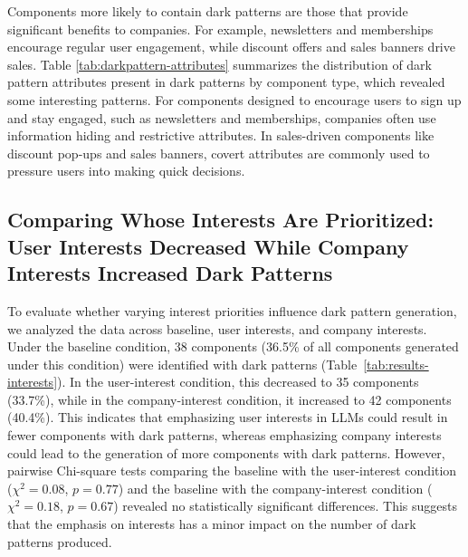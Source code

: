 

Components more likely to contain dark patterns are those that provide significant benefits to companies. For example, newsletters and memberships encourage regular user engagement, while discount offers and sales banners drive sales. Table \ref{tab:darkpattern-attributes} summarizes the distribution of dark pattern attributes present in dark patterns by component type, which revealed some interesting patterns. For components designed to encourage users to sign up and stay engaged, such as newsletters and memberships, companies often use information hiding and restrictive attributes. In sales-driven components like discount pop-ups and sales banners, covert attributes are commonly used to pressure users into making quick decisions. 

\subsection{Comparing Whose Interests Are Prioritized: User Interests Decreased While Company Interests Increased Dark Patterns}

To evaluate whether varying interest priorities influence dark pattern generation, we analyzed the data across baseline, user interests, and company interests. Under the baseline condition, 38 components (36.5\% of all components generated under this condition) were identified with dark patterns (Table~\ref{tab:results-interests}). In the user-interest condition, this decreased to 35 components (33.7\%), while in the company-interest condition, it increased to 42 components (40.4\%). %
This indicates that emphasizing user interests in LLMs could result in fewer components with dark patterns, whereas emphasizing company interests could lead to the generation of more components with dark patterns. However, pairwise Chi-square tests comparing the baseline with the user-interest condition ($\chi^2= 0.08$, $p = 0.77$) and the baseline with the company-interest condition ($\chi^2= 0.18$, $p = 0.67$) revealed no statistically significant differences. %
This suggests that the emphasis on interests has %
a minor impact on the number of dark patterns produced.

